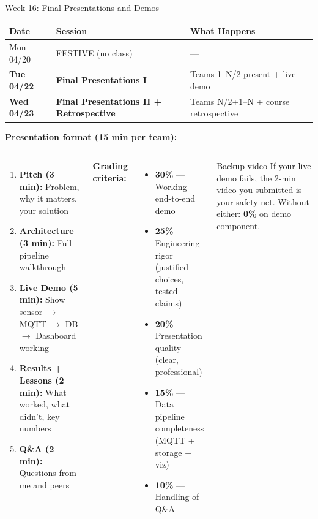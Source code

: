 \documentclass[aspectratio=169,11pt]{beamer}
\begin{document}
\begin{frame}{Week 16: Final Presentations and Demos}
    \begin{center}
    \footnotesize
    \begin{tabular}{llll}
        \toprule
        \textbf{Date} & \textbf{Session} & \textbf{What Happens} \\
        \midrule
        Mon 04/20 & FESTIVE (no class) & --- \\
        \textbf{Tue 04/22} & \textbf{Final Presentations I} & Teams 1--N/2 present + live demo \\
        \textbf{Wed 04/23} & \textbf{Final Presentations II + Retrospective} & Teams N/2+1--N + course retrospective \\
        \bottomrule
    \end{tabular}
    \normalsize
    \end{center}

    \vspace{0.2cm}
    \textbf{Presentation format (15 min per team):}
    \begin{columns}
        \begin{enumerate}
            \item \textbf{Pitch (3 min):} Problem, why it matters, your solution
            \item \textbf{Architecture (3 min):} Full pipeline walkthrough
            \item \textbf{Live Demo (5 min):} Show sensor $\rightarrow$ MQTT $\rightarrow$ DB $\rightarrow$ Dashboard working
            \item \textbf{Results + Lessons (2 min):} What worked, what didn't, key numbers
            \item \textbf{Q\&A (2 min):} Questions from me and peers
        \end{enumerate}

        \textbf{Grading criteria:}
        \begin{itemize}
            \item \textbf{30\%} --- Working end-to-end demo
            \item \textbf{25\%} --- Engineering rigor (justified choices, tested claims)
            \item \textbf{20\%} --- Presentation quality (clear, professional)
            \item \textbf{15\%} --- Data pipeline completeness (MQTT + storage + viz)
            \item \textbf{10\%} --- Handling of Q\&A
        \end{itemize}

        \vspace{0.1cm}
        \begin{alertblock}{Backup video}
            If your live demo fails, the 2-min video you submitted is your safety net. Without either: \textbf{0\%} on demo component.
        \end{alertblock}
    \end{columns}
\end{frame}
\end{document}
